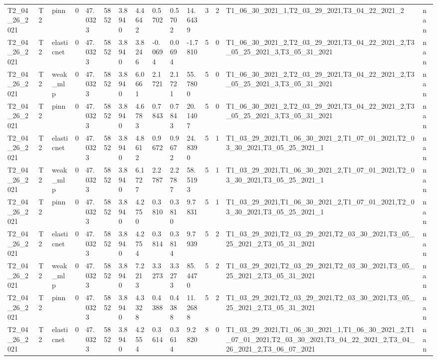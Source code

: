 \begin{table}[t]
\begin{tabular}{lllllllllllllll}
T2\_04\_26\_2021 & T2 & pinn & 0 & 47.0323 & 5852 & 3.8940 & 4.4642 & 0.5702 & 0.5702 & 14.6439 & 3 & 2 & T1\_06\_30\_2021\_1,T2\_03\_29\_2021,T3\_04\_22\_2021\_2 & nan \\
T2\_04\_26\_2021 & T2 & elasticnet & 0 & 47.0323 & 5852 & 3.8940 & 3.8246 & -0.0694 & 0.0694 & -1.7810 & 5 & 0 & T1\_06\_30\_2021\_2,T2\_03\_29\_2021,T3\_04\_22\_2021\_2,T3\_05\_25\_2021\_3,T3\_05\_31\_2021 & nan \\
T2\_04\_26\_2021 & T2 & weak\_mlp & 0 & 47.0323 & 5852 & 3.8940 & 6.0661 & 2.1721 & 2.1721 & 55.7800 & 5 & 0 & T1\_06\_30\_2021\_2,T2\_03\_29\_2021,T3\_04\_22\_2021\_2,T3\_05\_25\_2021\_3,T3\_05\_31\_2021 & nan \\
T2\_04\_26\_2021 & T2 & pinn & 0 & 47.0323 & 5852 & 3.8940 & 4.6783 & 0.7843 & 0.7843 & 20.1407 & 5 & 0 & T1\_06\_30\_2021\_2,T2\_03\_29\_2021,T3\_04\_22\_2021\_2,T3\_05\_25\_2021\_3,T3\_05\_31\_2021 & nan \\
T2\_04\_26\_2021 & T2 & elasticnet & 0 & 47.0323 & 5852 & 3.8940 & 4.8612 & 0.9672 & 0.9672 & 24.8390 & 5 & 1 & T1\_03\_29\_2021,T1\_06\_30\_2021\_2,T1\_07\_01\_2021,T2\_03\_30\_2021,T3\_05\_25\_2021\_1 & nan \\
T2\_04\_26\_2021 & T2 & weak\_mlp & 0 & 47.0323 & 5852 & 3.8940 & 6.1727 & 2.2787 & 2.2787 & 58.5193 & 5 & 1 & T1\_03\_29\_2021,T1\_06\_30\_2021\_2,T1\_07\_01\_2021,T2\_03\_30\_2021,T3\_05\_25\_2021\_1 & nan \\
T2\_04\_26\_2021 & T2 & pinn & 0 & 47.0323 & 5852 & 3.8940 & 4.2750 & 0.3810 & 0.3810 & 9.7831 & 5 & 1 & T1\_03\_29\_2021,T1\_06\_30\_2021\_2,T1\_07\_01\_2021,T2\_03\_30\_2021,T3\_05\_25\_2021\_1 & nan \\
T2\_04\_26\_2021 & T2 & elasticnet & 0 & 47.0323 & 5852 & 3.8940 & 4.2754 & 0.3814 & 0.3814 & 9.7939 & 5 & 2 & T1\_03\_29\_2021,T2\_03\_29\_2021,T2\_03\_30\_2021,T3\_05\_25\_2021\_2,T3\_05\_31\_2021 & nan \\
T2\_04\_26\_2021 & T2 & weak\_mlp & 0 & 47.0323 & 5852 & 3.8940 & 7.2213 & 3.3273 & 3.3273 & 85.4470 & 5 & 2 & T1\_03\_29\_2021,T2\_03\_29\_2021,T2\_03\_30\_2021,T3\_05\_25\_2021\_2,T3\_05\_31\_2021 & nan \\
T2\_04\_26\_2021 & T2 & pinn & 0 & 47.0323 & 5852 & 3.8940 & 4.3328 & 0.4388 & 0.4388 & 11.2688 & 5 & 2 & T1\_03\_29\_2021,T2\_03\_29\_2021,T2\_03\_30\_2021,T3\_05\_25\_2021\_2,T3\_05\_31\_2021 & nan \\
T2\_04\_26\_2021 & T2 & elasticnet & 0 & 47.0323 & 5852 & 3.8940 & 4.2554 & 0.3614 & 0.3614 & 9.2820 & 8 & 0 & T1\_03\_29\_2021,T1\_06\_30\_2021\_1,T1\_06\_30\_2021\_2,T1\_07\_01\_2021,T2\_03\_30\_2021,T3\_04\_22\_2021\_2,T3\_04\_26\_2021\_2,T3\_06\_07\_2021 & nan \\

\end{tabular}
\end{table}
